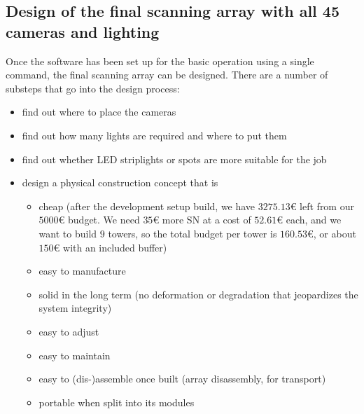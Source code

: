 \subsection{Design of the final scanning array with all 45 cameras and lighting}
	Once the software has been set up for the basic operation using a single command, the final scanning array can be designed. There are a number of substeps that go into the design process:
	\begin{itemize}
		\item find out where to place the cameras
		\item find out how many lights are required and where to put them
		\item find out whether LED striplights or spots are more suitable for the job
		\item design a physical construction concept that is
		\begin{itemize}
			\item cheap (after the development setup build, we have $3275.13$\euro{} left from our $5000$\euro{} budget. We need $35$\euro{} more SN at a cost of $52.61$\euro{} each, and we want to build $9$ towers, so the total budget per tower is $160.53$\euro{}, or about $150$\euro{} with an included buffer)
			\item easy to manufacture
			\item solid in the long term (no deformation or degradation that jeopardizes the system integrity)
			\item easy to adjust
			\item easy to maintain
			\item easy to (dis-)assemble once built (array disassembly, for transport)		
			\item portable when split into its modules
		\end{itemize}
	\end{itemize}
	
